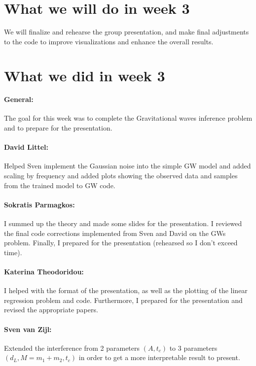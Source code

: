 \documentclass{article}
\begin{document}
\section*{What we will do in week 3}
We will finalize and rehearse the group presentation, and make final adjustments to the code to improve visualizations and enhance the overall results.


\section*{What we did in week 3}
\paragraph{General:}
The goal for this week was to complete the Gravitational waves inference problem and to prepare for the presentation.

\paragraph{David Littel:}
Helped Sven implement the Gaussian noise into the simple GW model and added scaling by frequency and added plots showing the observed data and samples from the trained model to GW code.

\paragraph{Sokratis Parmagkos:}
I summed up the theory and made some slides for the presentation. I reviewed the final code corrections implemented from Sven and David on the GWs problem. Finally, I prepared for the presentation (rehearsed so I don't exceed time).

\paragraph{Katerina Theodoridou:}
I helped with the format of the presentation, as well as the plotting of the linear regression problem and code. Furthermore, I prepared for the presentation and revised the appropriate papers. 

\paragraph{Sven van Zijl:}
Extended the interference from 2 parameters $(A, t_c)$ to 3 parameters $(d_L, M = m_1 + m_2, t_c)$ in order to get a more interpretable result to present. 
\end{document}
